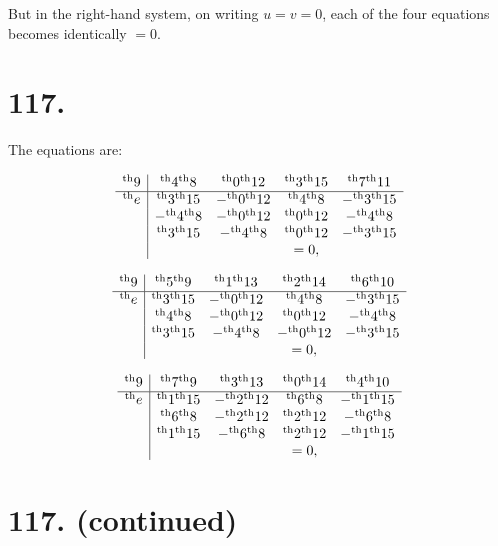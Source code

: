 \documentclass[11pt,a4paper]{book}
\providecommand{\uth}{\textsuperscript{th}}
\begin{document}
But in the right-hand system, on writing $u = v = 0$, each of the four equations becomes identically $= 0$.


\newpage
\section*{117.}
\label{sec:117}

The equations are:

\[
\begin{array}{c|cccc}
\uth{9} & \uth{4}\uth{8} & \uth{0}\uth{12} & \uth{3}\uth{15} & \uth{7}\uth{11} \\
\hline
\uth{e} & \uth{3}\uth{15} & -\uth{0}\uth{12} & \uth{4}\uth{8} & -\uth{3}\uth{15} \\
& -\uth{4}\uth{8} & -\uth{0}\uth{12} & \uth{0}\uth{12} & -\uth{4}\uth{8} \\
& \uth{3}\uth{15} & -\uth{4}\uth{8} & \uth{0}\uth{12} & -\uth{3}\uth{15} \\
& & & = 0,
\end{array}
\]

\[
\begin{array}{c|cccc}
\uth{9} & \uth{5}\uth{9} & \uth{1}\uth{13} & \uth{2}\uth{14} & \uth{6}\uth{10} \\
\hline
\uth{e} & \uth{3}\uth{15} & -\uth{0}\uth{12} & \uth{4}\uth{8} & -\uth{3}\uth{15} \\
& \uth{4}\uth{8} & -\uth{0}\uth{12} & \uth{0}\uth{12} & -\uth{4}\uth{8} \\
& \uth{3}\uth{15} & -\uth{4}\uth{8} & -\uth{0}\uth{12} & -\uth{3}\uth{15} \\
& & & = 0,
\end{array}
\]

\[
\begin{array}{c|cccc}
\uth{9} & \uth{7}\uth{9} & \uth{3}\uth{13} & \uth{0}\uth{14} & \uth{4}\uth{10} \\
\hline
\uth{e} & \uth{1}\uth{15} & -\uth{2}\uth{12} & \uth{6}\uth{8} & -\uth{1}\uth{15} \\
& \uth{6}\uth{8} & -\uth{2}\uth{12} & \uth{2}\uth{12} & -\uth{6}\uth{8} \\
& \uth{1}\uth{15} & -\uth{6}\uth{8} & \uth{2}\uth{12} & -\uth{1}\uth{15} \\
& & & = 0,
\end{array}
\]

\newpage
\section*{117. (continued)}
\label{sec:117cont}
\end{document}
